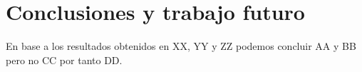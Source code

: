\chapter{Conclusiones y trabajo futuro}
En base a los resultados obtenidos en XX, YY y ZZ podemos concluir AA y BB pero no CC por tanto DD.

